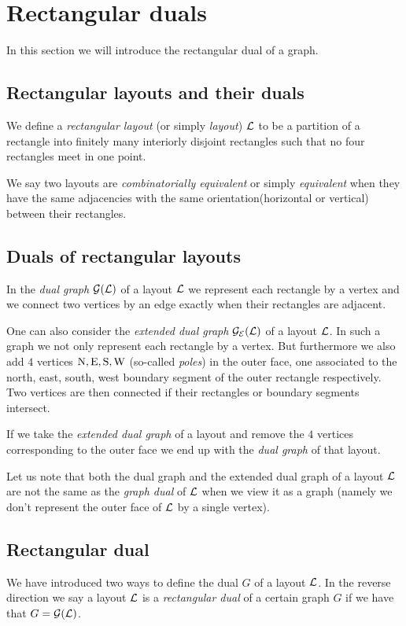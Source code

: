 
\section{Rectangular duals}
\newcommand{\G}{\scr G}
\renewcommand{\L}{\scr L}

In this section we will introduce the rectangular dual of a graph.

\subsection{Rectangular layouts and their duals}
  We define a \emph{rectangular layout} (or simply \emph{layout}) $\L$ to be a partition of a rectangle into finitely many interiorly disjoint rectangles such that no four rectangles meet in one point.

  We say two layouts are  \emph{combinatorially equivalent} or simply \emph{equivalent} when they have the same adjacencies with the same orientation(horizontal or vertical) between their rectangles.

\subsection{Duals of rectangular layouts}
  In the \emph{dual graph} $\dualgraph{\L}$ of a layout $\L$ we represent each rectangle by a vertex and we connect two vertices by an edge exactly when their rectangles are adjacent.

  One can also consider the \emph{extended dual graph} $\extdualgraph{\L}$ of a layout $\L$. In such a graph we not only represent each rectangle by a vertex. But furthermore we also add $4$ vertices $\mathrm{N}, \mathrm{E}, \mathrm{S}, \mathrm{W}$ (so-called \emph{poles}) in the outer face, one associated to the north, east, south, west boundary segment of the outer rectangle respectively. Two vertices are then connected if their rectangles or boundary segments intersect.

  If we take the \emph{extended dual graph} of a layout and remove the $4$ vertices corresponding to the outer face we end up with the \emph{dual graph} of that layout.

  Let us note that both the dual graph and the extended dual graph of a layout $\L$ are not the same as the \emph{graph dual} of $\L$ when we view it as a graph (namely we don't represent the outer face of $\L$ by a single vertex).

\subsection{Rectangular dual}
  We have introduced two ways to define the dual $G$ of a layout $\L$. In the reverse direction we say a layout $\L$ is a \emph{rectangular dual} of a certain graph $G$ if we have that $G = \dualgraph{\L}$.

